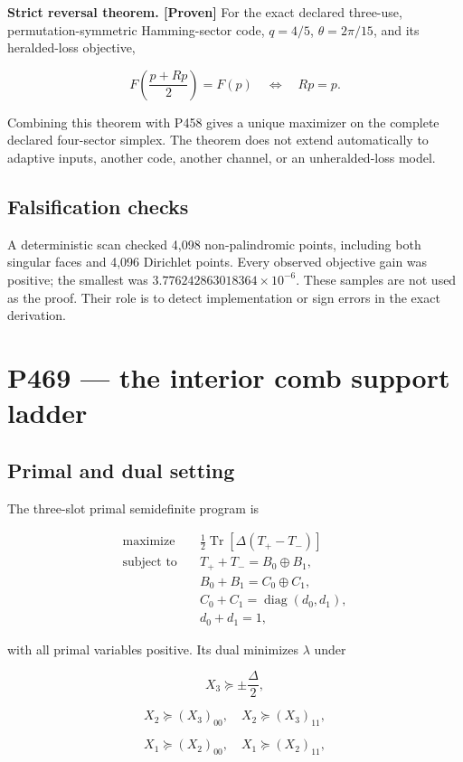 \documentclass[11pt,a4paper,openany]{report}
\newcommand{\statusProven}{\textcolor{fingreen}{[Proven]}}
\begin{document}
\textbf{Strict reversal theorem. \statusProven{}} For the exact declared three-use, permutation-symmetric Hamming-sector code, \(q=4/5\), \(\theta=2\pi/15\), and its heralded-loss objective,

\[
F\!\left(\frac{p+Rp}{2}\right)=F(p)
\quad\Longleftrightarrow\quad Rp=p.
\]

Combining this theorem with P458 gives a unique maximizer on the complete declared four-sector simplex. The theorem does not extend automatically to adaptive inputs, another code, another channel, or an unheralded-loss model.

\section{Falsification checks}

A deterministic scan checked 4,098 non-palindromic points, including both singular faces and 4,096 Dirichlet points. Every observed objective gain was positive; the smallest was \(3.776242863018364\times10^{-6}\). These samples are not used as the proof. Their role is to detect implementation or sign errors in the exact derivation.

\chapter{P469 --- the interior comb support ladder}

\section{Primal and dual setting}

The three-slot primal semidefinite program is

\[
\begin{aligned}
\text{maximize}\quad&
\frac12\operatorname{Tr}[\Delta(T_+-T_-)]\\
\text{subject to}\quad&
T_++T_-=B_0\oplus B_1,\\
&B_0+B_1=C_0\oplus C_1,\\
&C_0+C_1=\operatorname{diag}(d_0,d_1),\\
&d_0+d_1=1,
\end{aligned}
\]

with all primal variables positive. Its dual minimizes \(\lambda\) under

\[
X_3\succeq\pm\frac\Delta2,
\]

\[
X_2\succeq(X_3)_{00},\quad
X_2\succeq(X_3)_{11},
\]

\[
X_1\succeq(X_2)_{00},\quad
X_1\succeq(X_2)_{11},
\]
\end{document}
